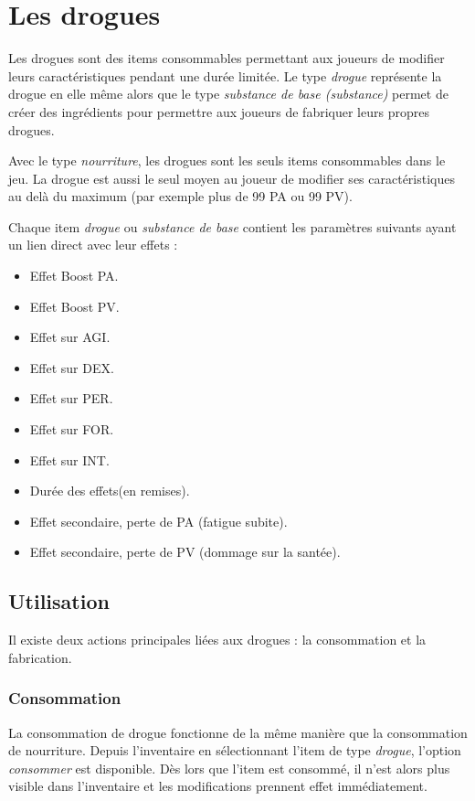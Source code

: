 \section{Les drogues}

Les drogues sont des items consommables permettant aux joueurs de modifier leurs caractéristiques pendant une durée limitée. Le type  \emph{drogue} représente la drogue en elle même alors que le type \emph{substance de base (substance)} permet de créer des ingrédients pour permettre aux joueurs de fabriquer leurs propres drogues.

Avec le type \emph{nourriture}, les drogues sont les seuls items consommables dans le jeu. La drogue est aussi le seul moyen au joueur de modifier ses caractéristiques au delà du maximum (par exemple plus de 99 PA ou 99 PV).

Chaque item \emph{drogue} ou \emph{substance de base} contient les paramètres suivants ayant un lien direct avec leur effets : 
\begin{itemize}
\item Effet Boost PA.
\item Effet Boost PV.
\item Effet sur AGI.
\item Effet sur DEX.
\item Effet sur PER.
\item Effet sur FOR.
\item Effet sur INT.
\item Durée des effets(en remises).
\item Effet secondaire, perte de PA (fatigue subite).
\item Effet secondaire, perte de PV (dommage sur la santée).
\end{itemize}

\subsection{Utilisation}

Il existe deux actions principales liées aux drogues : la consommation et la fabrication.

\subsubsection{Consommation}

La consommation de drogue fonctionne de la même manière que la consommation de nourriture. Depuis l'inventaire en sélectionnant l'item de type \emph{drogue}, l'option \emph{consommer} est disponible. Dès lors que l'item est consommé, il n'est alors plus visible dans l'inventaire et les modifications prennent effet immédiatement.

